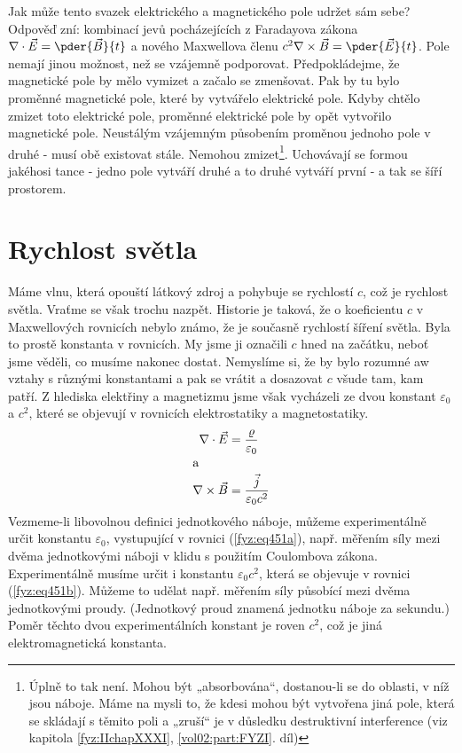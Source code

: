   Jak může tento svazek elektrického a magnetického pole udržet sám sebe? Odpověď zní: kombinací 
  jevů pocházejících z Faradayova zákona \(\nabla\cdot\vec{E} = \pder{\vec{B}}{t}\) a nového 
  Maxwellova členu \(c^2\nabla\times\vec{B} =\pder{\vec{E}}{t}\). Pole nemají jinou možnost, než 
  se vzájemně podporovat. Předpokládejme, že magnetické pole by mělo vymizet a začalo se zmenšovat. 
  Pak by tu bylo proměnné magnetické pole, které by vytvářelo elektrické pole. Kdyby chtělo zmizet 
  toto elektrické pole, proměnné elektrické pole by opět vytvořilo magnetické pole. Neustálým 
  vzájemným působením proměnou jednoho pole v druhé - musí obě existovat stále. Nemohou 
  zmizet\footnote{ Úplně to tak není. Mohou být „absorbována“, dostanou-li se do oblasti, v níž 
  jsou náboje. Máme na mysli to, že kdesi mohou být vytvořena jiná pole, která se skládají s těmito 
  poli a „zruší“ je v důsledku destruktivní interference (viz kapitola \ref{fyz:IIchapXXXI}, 
  \ref{vol02:part:FYZI}. díl)}. Uchovávají se formou jakéhosi tance - jedno pole vytváří druhé a to druhé 
  vytváří první - a tak se šíří prostorem.

\section{Rychlost světla}\label{fyz:IIchapXVIIIsecIV}
  Máme vlnu, která opouští látkový zdroj a pohybuje se rychlostí \(c\), což je rychlost světla. 
  Vraťme se však trochu nazpět. Historie je taková, že o koeficientu \(c\) v Maxwellových rovnicích 
  nebylo známo, že je současně rychlostí šíření světla. Byla to prostě konstanta v rovnicích. My 
  jsme ji označili \(c\) hned na začátku, neboť jsme věděli, co musíme nakonec dostat. Nemyslíme 
  si, že by bylo rozumné aw vztahy s různými konstantami a pak se vrátit a dosazovat \(c\) všude 
  tam, kam patří. Z hlediska elektřiny a magnetizmu jsme však vycházeli ze dvou konstant 
  \(\varepsilon_0\) a \(c^2\), které se objevují v rovnicích elektrostatiky a magnetostatiky.
  \begin{subequations}\label{fyz:eq451}
    \begin{align}
      \nabla\cdot\vec{E}  &= \frac{\varrho}{\varepsilon_0}    \label{fyz:eq451a}\\
      \shortintertext{a} 
      \nabla\times\vec{B} &= \frac{\vec{j}}{\varepsilon_0c^2} \label{fyz:eq451b}
    \end{align}
  \end{subequations}
  Vezmeme-li libovolnou definici jednotkového náboje, můžeme experimentálně určit konstantu 
  \(\varepsilon_0\), vystupující v rovnici (\ref{fyz:eq451a}), např. měřením síly mezi dvěma 
  jednotkovými náboji v klidu s použitím Coulombova zákona. Experimentálně musíme určit i konstantu 
  \(\varepsilon_0c^2\), která se objevuje v rovnici (\ref{fyz:eq451b}). Můžeme to udělat např. 
  měřením síly působící mezi dvěma jednotkovými proudy. (Jednotkový proud znamená jednotku náboje 
  za sekundu.) Poměr těchto dvou experimentálních konstant je roven \(c^2\), což je jiná 
  elektromagnetická konstanta. 
 
